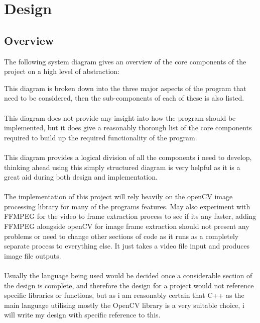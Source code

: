 \documentclass[11pt]{report}
\begin{document}
\chapter{Design}
\thispagestyle{fancy}

\section{Overview}
The following system diagram gives an overview of the core components of the project on a high level of abstraction:
\begin{center}
\end{center}
This diagram is broken down into the three major aspects of the program that need to be considered, then the sub-components of each of these is also listed.\\\\
This diagram does not provide any insight into how the program should be implemented, but it does give a reasonably thorough list of the core components required to build up the required functionality of the program.\\\\
This diagram provides a logical division of all the components i need to develop, thinking ahead using this simply structured diagram is very helpful as it is a great aid during both design and implementation.\\\\
The implementation of this project will rely heavily on the openCV image processing library for many of the programs features. May also experiment with FFMPEG for the video to frame extraction process to see if its any faster, adding FFMPEG alongside openCV for image frame extraction should not present any problems or need to change other sections of code as it runs as a completely separate process to everything else. It just takes a video file input and produces image file outputs.\\\\
Usually the language being used would be decided once a considerable section of the design is complete, and therefore the design for a project would not reference specific libraries or functions, but as i am reasonably certain that C++ as the main language utilising mostly the OpenCV library is a very suitable choice, i will write my design with specific reference to this.
\end{document}
